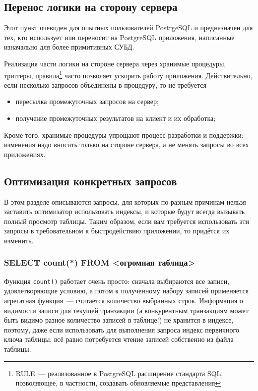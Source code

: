 \subsection{Перенос логики на сторону сервера}

Этот пункт очевиден для опытных пользователей PostrgeSQL и предназначен для тех, кто использует или переносит на PostgreSQL приложения, написанные изначально для более примитивных СУБД.

Реализация части логики на стороне сервера через хранимые процедуры, триггеры, правила\footnote{RULE~--- реализованное в PostgreSQL расширение стандарта SQL, позволяющее, в частности, создавать обновляемые представления} часто позволяет ускорить работу приложения. Действительно, если несколько запросов объединены в процедуру, то не требуется

\begin{itemize}
  \item пересылка промежуточных запросов на сервер;
  \item получение промежуточных результатов на клиент и их обработка;
\end{itemize}

Кроме того, хранимые процедуры упрощают процесс разработки и поддержки: изменения надо вносить только на стороне сервера, а не менять запросы во всех приложениях.

\subsection{Оптимизация конкретных запросов}
\label{sec:pg-optimize-sql}

В этом разделе описываются запросы, для которых по разным причинам нельзя заставить оптимизатор использовать индексы, и которые будут всегда вызывать полный просмотр таблицы. Таким образом, если вам требуется использовать эти запросы в требовательном к быстродействию приложении, то придётся их изменить.

\subsubsection{SELECT count(*) FROM <огромная таблица>}

Функция \lstinline!count()! работает очень просто: сначала выбираются все записи, удовлетворяющие условию, а потом к полученному набору записей применяется агрегатная функция~--- считается количество выбранных строк. Информация о видимости записи для текущей транзакции (а конкурентным транзакциям может быть видимо разное количество записей в таблице!) не хранится в индексе, поэтому, даже если использовать для выполнения запроса индекс первичного ключа таблицы, всё равно потребуется чтение записей собственно из файла таблицы.

